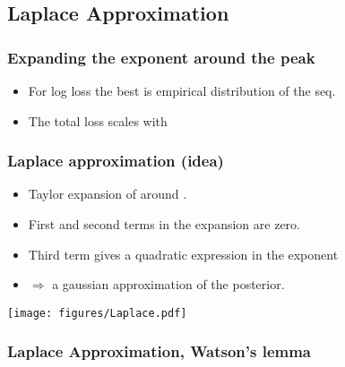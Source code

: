 \documentclass[handout]{beamer}
\begin{document}
\subsection{Laplace Approximation}
\begin{frame}
\frametitle{Expanding the exponent around the peak}

\begin{itemize}
\item
For log loss the best \R{$\theta$} is empirical distribution
of the seq.
\R{\[
	\btheta = {\#\{x^t=1;\;\; 1 \leq t \leq T \} \over T} 
\]}
\item
The total loss scales with 
\R{\[
\TEloss{\theta} =
 T \cdot (\btheta \ell(\theta,1) + (1-\btheta)\ell(\theta,0))
 \doteq T \cdot g(\btheta,\theta)
\]}
\end{itemize}
\pause
{}
\end{frame}

\begin{frame}
\frametitle{Laplace approximation (idea)}
\begin{itemize}
\item Taylor expansion of  around \R{$\theta=\btheta$}.
\item
First and second terms in the expansion are zero.
\item
Third term gives a quadratic expression in the exponent
\item
$\Rightarrow$ a gaussian approximation of the posterior.
\end{itemize}
\pause
\texttt{[image: figures/Laplace.pdf]}

\end{frame}

\begin{frame}
\frametitle{Laplace Approximation, Watson's lemma}

\end{frame}
\end{document}
